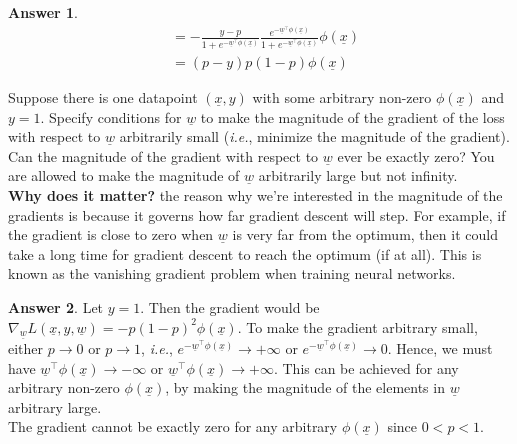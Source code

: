 \documentclass{article}
\renewcommand{\vec}[1]{\underline{#1}}
\newcommand{\vecw}{\vec{w}}
\theoremstyle{definition}
\newtheorem*{answer}{Answer}
\begin{document}
\begin{question}
\begin{question}
\begin{answer}
\begin{align*}
				&=-\frac{y-p}{1+e^{-\vecw^\top\phi(\underline{x})}} \frac{e^{-\vecw^\top\phi(\underline{x})}}{1+e^{-\vecw^\top\phi(\underline{x})}}\phi(\underline{x})\\
				&=(p-y) p(1-p) \phi(\underline{x})
			\end{align*}
		\end{answer}
		\item Suppose there is one datapoint $(\underline{x},y)$ with some arbitrary non-zero $\phi(\underline{x})$ and $y=1$. Specify conditions for $\underline{w}$ to make the magnitude of the gradient of the loss with respect to $\underline{w}$ arbitrarily small (\textit{i.e.}, minimize the magnitude of the gradient). Can the magnitude of the gradient with respect to $\underline{w}$ ever be exactly zero? You are allowed to make the magnitude of $\underline{w}$ arbitrarily large but not infinity.\\
		
		\textbf{Why does it matter?} the reason why we're interested in the magnitude of the gradients is because it governs how far gradient descent will step. For example, if the gradient is close to zero when $\underline{w}$ is very far from the optimum, then it could take a long time for gradient descent to reach the optimum (if at all). This is known as the vanishing gradient problem when training neural networks.
		\begin{answer}
			Let $y=1$. Then the gradient would be $\nabla_{\underline{w}}L(\underline{x},y,\underline{w})= -p(1-p)^2 \phi(\underline{x})$. To make the gradient arbitrary small, either $p\rightarrow 0$ or $p\rightarrow 1$, \emph{i.e.}, $e^{-\vecw^\top\phi(\underline{x})} \rightarrow +\infty$ or $e^{-\vecw^\top\phi(\underline{x})} \rightarrow 0$. Hence, we must have $\vecw^\top\phi(\underline{x}) \rightarrow -\infty$ or $\vecw^\top\phi(\underline{x}) \rightarrow +\infty$. This can be achieved for any arbitrary non-zero $\phi(\underline{x})$, by making the magnitude of the elements  in $\vecw$ arbitrary large.\\
			
			The gradient cannot be exactly zero for any arbitrary $\phi(\underline{x})$ since $0<p<1$. 
		\end{answer}
	\end{question}
\end{question}
\end{document}
